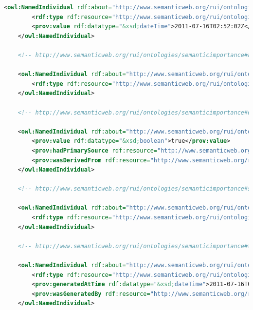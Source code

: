 \begin{lstlisting}[language=XML,caption={Semantic Importance Ontology File (update this file)}]
    <owl:NamedIndividual rdf:about="http://www.semanticweb.org/rui/ontologies/semanticimportance#aTimestampWhenDataIsGenerated">
        <rdf:type rdf:resource="http://www.semanticweb.org/rui/ontologies/semanticimportance#GenerationTimestamp"/>
        <prov:value rdf:datatype="&xsd;dateTime">2011-07-16T02:52:02Z</prov:value>
    </owl:NamedIndividual>

    <!-- http://www.semanticweb.org/rui/ontologies/semanticimportance#aTrustEquation -->

    <owl:NamedIndividual rdf:about="http://www.semanticweb.org/rui/ontologies/semanticimportance#aTrustEquation">
        <rdf:type rdf:resource="http://www.semanticweb.org/rui/ontologies/semanticimportance#TrustModel"/>
    </owl:NamedIndividual>

    <!-- http://www.semanticweb.org/rui/ontologies/semanticimportance#dataItemXisRelevantToQueryY -->

    <owl:NamedIndividual rdf:about="http://www.semanticweb.org/rui/ontologies/semanticimportance#dataItemXisRelevantToQueryY">
        <prov:value rdf:datatype="&xsd;boolean">true</prov:value>
        <prov:hadPrimarySource rdf:resource="http://www.semanticweb.org/rui/ontologies/semanticimportance#aDataGraph"/>
        <prov:wasDerivedFrom rdf:resource="http://www.semanticweb.org/rui/ontologies/semanticimportance#aSoccerOffsideRelevanceOntology"/>
    </owl:NamedIndividual>

    <!-- http://www.semanticweb.org/rui/ontologies/semanticimportance#stardogQueryEngine -->

    <owl:NamedIndividual rdf:about="http://www.semanticweb.org/rui/ontologies/semanticimportance#stardogQueryEngine">
        <rdf:type rdf:resource="http://www.semanticweb.org/rui/ontologies/semanticimportance#QueryEngine"/>
    </owl:NamedIndividual>
 
    <!-- http://www.semanticweb.org/rui/ontologies/semanticimportance#theTimestampWhenQueryEngineUsesADataItemToProduceResult -->

    <owl:NamedIndividual rdf:about="http://www.semanticweb.org/rui/ontologies/semanticimportance#theTimestampWhenQueryEngineUsesADataItemToProduceResult">
        <rdf:type rdf:resource="http://www.semanticweb.org/rui/ontologies/semanticimportance#QueryParticipationRecency"/>
        <prov:generatedAtTime rdf:datatype="&xsd;dateTime">2011-07-16T02:52:02Z</prov:generatedAtTime>
        <prov:wasGeneratedBy rdf:resource="http://www.semanticweb.org/rui/ontologies/semanticimportance#aDataItemIsUsedByQueryEngineForResults"/>
    </owl:NamedIndividual>


\end{lstlisting}
